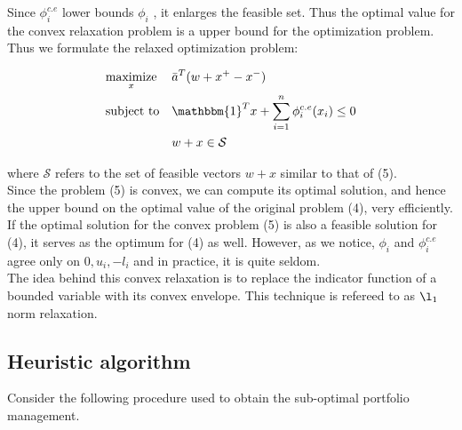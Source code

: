 \documentclass[a4paper]{article}
\begin{document}
Since $\phi_i^{c.e}$ lower bounds $\phi_i$ , it enlarges the feasible set. Thus the optimal value for the convex relaxation problem is a upper  bound for the optimization problem. Thus we formulate the relaxed optimization problem:

\begin{equation}
\begin{aligned}
& \underset{x}{\text{maximize}}
& & \bar{a}^T (w+x^+ - x^-) \\
& \text{subject to}
& & \mathbbm{1}^Tx + \displaystyle \sum_{i=1}^n \phi_i^{c.e}(x_i) \leq 0  \\
& & & w+x \in \mathcal{S}\\
\end{aligned}
\end{equation}

where $\mathcal{S}$ refers to the set of feasible vectors $w+x$ similar to that of (5).\\

Since the problem (5) is convex, we can compute its optimal solution, and hence the upper
bound on the optimal value of the original problem (4), very efficiently.\\

If the optimal solution for the convex problem (5) is also a feasible solution for (4), it serves as the optimum for (4) as well. However, as we notice, $\phi_i$ and $\phi_i^{c.e}$ agree only on $0, u_i, -l_i$ and in practice, it is quite seldom.\\

The idea behind this convex relaxation is to replace the indicator function of a bounded variable with its convex envelope. This technique is refereed to as $\l_1$ norm relaxation.\cite{2}
\subsection{Heuristic algorithm}

Consider the following  procedure used to obtain the sub-optimal portfolio management.
\end{document}
